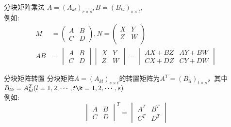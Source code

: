 \documentclass[lang=cn,10pt]{elegantbook}
\begin{document}
\begin{definition}{分块矩阵乘法}
    $A = (A_{kl})_{r \times s},  B = (B_{kl})_{s \times t}$,\\例如:
        \begin{equation}
        \begin{aligned}
             M &= \begin{pmatrix}
                A&B\\
                C&D
            \end{pmatrix},
            N = \begin{pmatrix}
                 X&Y\\
                 Z&W\\
            \end{pmatrix}
            \\
            AB&  = \begin{vmatrix}
                 A&B\\
                C&D
            \end{vmatrix}
            \begin{vmatrix}
                 X&Y\\
                 Z&W
            \end{vmatrix}
            = \begin{vmatrix}
                AX+BZ&AY+BW\\
                CX+DZ&CY+DW
            \end{vmatrix}
        \end{aligned}
        \end{equation}
\end{definition}

\begin{definition}{分块矩阵转置}%
    分块矩阵$A = (A_{kl})_{s \times t}$的转置矩阵为$A^T = (B_{il})_{t \times s}$，其中$B_{lk} = A^T_{kl}(l = 1,2,\cdots,t\k = 1,2,\cdots,s)$\\例如:
    \begin{equation}
        \begin{vmatrix}
            A&B\\
            C&D
        \end{vmatrix}^T
        = \begin{vmatrix}
            A^T&B^T\\
            C^T&D^T
        \end{vmatrix}
    \end{equation}
\end{definition}
\end{document}
